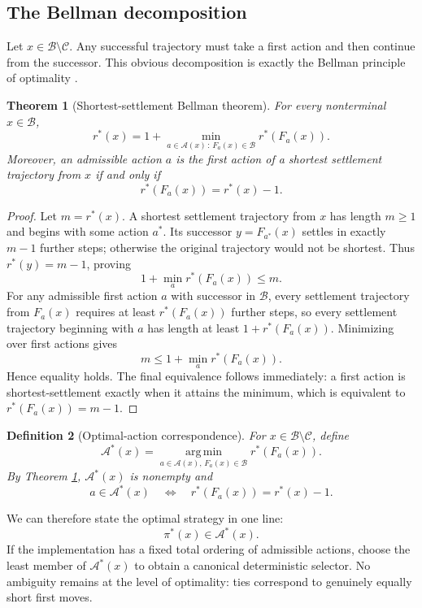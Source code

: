 \documentclass[11pt,letterpaper]{article}
\newtheorem{theorem}{Theorem}[section]
\newtheorem{definition}[theorem]{Definition}
\theoremstyle{remark}
\newcommand{\Cset}{\mathcal C}
\newcommand{\Basin}{\mathcal B}
\newcommand{\A}{\mathcal A}
\newcommand{\rstar}{r^{\!*}}
\newcommand{\argmin}{\operatorname*{arg\,min}}
\begin{document}
\subsection{The Bellman decomposition}

Let $x\in\Basin\setminus\Cset$. Any successful trajectory must take a first action and then continue from the successor. This obvious decomposition is exactly the Bellman principle of optimality \cite{Bellman}.

\begin{theorem}[Shortest-settlement Bellman theorem]\label{thm:bellman}
For every nonterminal $x\in\Basin$,
\[
\boxed{\rstar(x)=1+\min_{a\in\A(x)\,:\,F_a(x)\in\Basin}\rstar(F_a(x)).}
\]
Moreover, an admissible action $a$ is the first action of a shortest settlement trajectory from $x$ if and only if
\[
\rstar(F_a(x))=\rstar(x)-1.
\]
\end{theorem}

\begin{proof}
Let $m=\rstar(x)$. A shortest settlement trajectory from $x$ has length $m\ge1$ and begins with some action $a^*$. Its successor $y=F_{a^*}(x)$ settles in exactly $m-1$ further steps; otherwise the original trajectory would not be shortest. Thus $\rstar(y)=m-1$, proving
\[
1+\min_a\rstar(F_a(x))\le m.
\]
For any admissible first action $a$ with successor in $\Basin$, every settlement trajectory from $F_a(x)$ requires at least $\rstar(F_a(x))$ further steps, so every settlement trajectory beginning with $a$ has length at least $1+\rstar(F_a(x))$. Minimizing over first actions gives
\[
m\le1+\min_a\rstar(F_a(x)).
\]
Hence equality holds. The final equivalence follows immediately: a first action is shortest-settlement exactly when it attains the minimum, which is equivalent to $\rstar(F_a(x))=m-1$.
\end{proof}

\begin{definition}[Optimal-action correspondence]
For $x\in\Basin\setminus\Cset$, define
\[
\A^*(x)=\argmin_{a\in\A(x),\,F_a(x)\in\Basin}\rstar(F_a(x)).
\]
By Theorem \ref{thm:bellman}, $\A^*(x)$ is nonempty and
\[
a\in\A^*(x)\quad\Longleftrightarrow\quad \rstar(F_a(x))=\rstar(x)-1.
\]
\end{definition}

We can therefore state the optimal strategy in one line:
\[
\boxed{\pi^*(x)\in\A^*(x).}
\]
If the implementation has a fixed total ordering of admissible actions, choose the least member of $\A^*(x)$ to obtain a canonical deterministic selector. No ambiguity remains at the level of optimality: ties correspond to genuinely equally short first moves.
\end{document}
